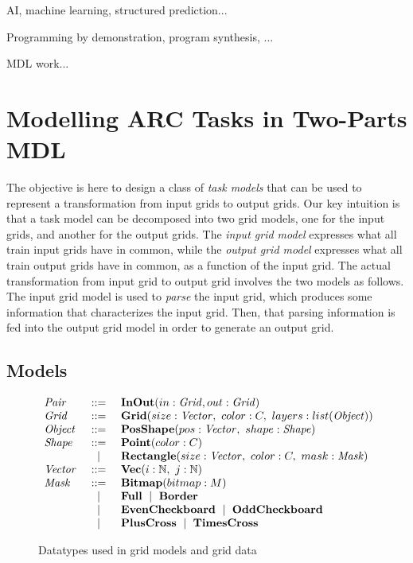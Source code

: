 \documentclass[a4paper]{llncs}
\newenvironment{datatype}{$\begin{array}{lcl}}{\end{array}$}
\newcommand{\is}{&\ ::=\ &}
\newcommand{\alter}{\ \mid\ }
\newcommand{\altis}{\\ &\ \mid\ &}
\newcommand{\nat}{\mathbb{N}}
\begin{document}
AI, machine learning, structured prediction...

Programming by demonstration, program synthesis, ...

MDL work...



\section{Modelling ARC Tasks in Two-Parts MDL}
\label{modelling}

The objective is here to design a class of {\em task models} that can
be used to represent a transformation from input grids to output
grids.
%
Our key intuition is that a task model can be decomposed into two grid
models, one for the input grids, and another for the output grids. The
{\em input grid model} expresses what all train input grids have in
common, while the {\em output grid model} expresses what all train
output grids have in common, as a function of the input grid.
%
The actual transformation from input grid to output grid involves the
two models as follows. The input grid model is used to {\em parse} the
input grid, which produces some information that characterizes the
input grid. Then, that parsing information is fed into the output grid
model in order to generate an output grid.

\subsection{Models}
\label{model}

\begin{figure}[t]
\begin{center}
\begin{datatype}
  {\it Pair} \is {\bf InOut}(in: {\it Grid}, out: {\it Grid})
  \\
  {\it Grid} \is {\bf Grid}(size: {\it Vector},\ color: C,\ layers: list({\it Object}))
  \\
  {\it Object} \is {\bf PosShape}(pos: {\it Vector},\ shape: {\it Shape})
  \\
  {\it Shape} \is {\bf Point}(color: C)
  \altis {\bf Rectangle}(size: {\it Vector},\ color: C,\ mask: {\it Mask})
  \\
  {\it Vector} \is {\bf Vec}(i: \nat,\ j: \nat)
  \\
  {\it Mask} \is {\bf Bitmap}(bitmap: M)
  \altis {\bf Full} \alter {\bf Border}
  \altis {\bf EvenCheckboard} \alter {\bf OddCheckboard}
  \altis {\bf PlusCross} \alter {\bf TimesCross}
\end{datatype}
\end{center}
\caption{Datatypes used in grid models and grid data}
\label{fig:patterns}
\end{figure}
\end{document}
